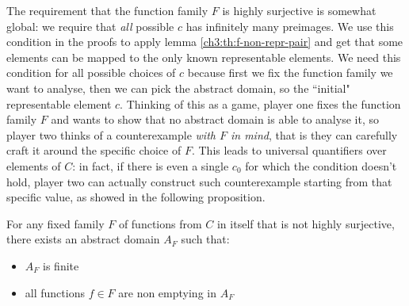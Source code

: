 The requirement that the function family $F$ is highly surjective is somewhat global: we require that \textit{all} possible $c$ has infinitely many preimages.
We use this condition in the proofs to apply lemma \ref{ch3:th:f-non-repr-pair} and get that some elements can be mapped to the only known representable elements. We need this condition for all possible choices of $c$ because first we fix the function family we want to analyse, then we can pick the abstract domain, so the ``initial" representable element $c$.
Thinking of this as a game, player one fixes the function family $F$ and wants to show that no abstract domain is able to analyse it, so player two thinks of a counterexample \textit{with $F$ in mind}, that is they can carefully craft it around the specific choice of $F$. This leads to universal quantifiers over elements of $C$: in fact, if there is even a single $c_0$ for which the condition doesn't hold, player two can actually construct such counterexample starting from that specific value, as showed in the following proposition.
\begin{prop}\label{ch4:th:no-higly-onto-domain-construction}
	For any fixed family $F$ of functions from $C$ in itself that is not highly surjective, there exists an abstract domain $A_F$ such that:
	\begin{itemize}
		\item $A_F$ is finite
		\item all functions $f \in F$ are non emptying in $A_F$
	\end{itemize}
\end{prop}
